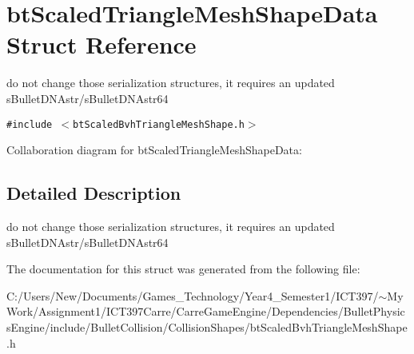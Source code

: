 \hypertarget{structbt_scaled_triangle_mesh_shape_data}{
\section{btScaledTriangleMeshShapeData Struct Reference}
\label{structbt_scaled_triangle_mesh_shape_data}
}
do not change those serialization structures, it requires an updated sBulletDNAstr/sBulletDNAstr64  


{\tt \#include $<$btScaledBvhTriangleMeshShape.h$>$}

Collaboration diagram for btScaledTriangleMeshShapeData:

\subsection{Detailed Description}
do not change those serialization structures, it requires an updated sBulletDNAstr/sBulletDNAstr64 

The documentation for this struct was generated from the following file:\begin{CompactItemize}
\item 
C:/Users/New/Documents/Games\_\-Technology/Year4\_\-Semester1/ICT397/$\sim$My Work/Assignment1/ICT397Carre/CarreGameEngine/Dependencies/BulletPhysicsEngine/include/BulletCollision/CollisionShapes/btScaledBvhTriangleMeshShape.h\end{CompactItemize}
